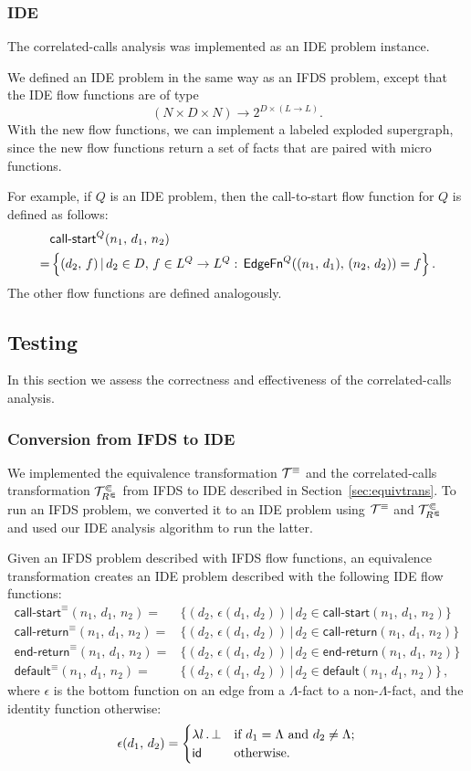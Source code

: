 \subsubsection{IDE}
The correlated-calls analysis was implemented as an IDE problem instance.

We defined an IDE problem in the same way as an IFDS problem, except that the IDE flow functions are of type
\[
  (N\times D\times N)\to2^{D\times (L\to L)}.
\]
With the new flow functions, we can implement a labeled exploded supergraph, since the new flow functions return a set of facts that are paired with micro functions.

For example, if $Q$ is an IDE problem, then the call-to-start flow function for $Q$ is defined as follows:
\begin{align*}
  &\textsf{call-start}^Q(n_1,\,d_1,\,n_2)\\
  =&\left\{(d_2,\,f)\,|\,d_2\in D,\,f\in L^Q\to L^Q:\,\textsf{EdgeFn}^Q((n_1,\,d_1),\,(n_2,\,d_2))=f\right\}.
\end{align*}
The other flow functions are defined analogously.

\subsection{Testing}
In this section we assess the correctness and effectiveness of the correlated-calls analysis.

\subsubsection{Conversion from IFDS to IDE}
We implemented the equivalence transformation $\mathcal T^\equiv$ and the correlated-calls transformation $\mathcal T^\Subset_{R^\Subset}$ from IFDS to IDE described in Section~\ref{sec:equivtrans}. To run an IFDS problem, we converted it to an IDE problem using $\mathcal T^\equiv$ and $\mathcal T^\Subset_{R^\Subset}$ and used our IDE analysis algorithm to run the latter.

Given an IFDS problem described with IFDS flow functions, an equivalence transformation creates an IDE problem described with the following IDE flow functions:
\begin{align*}
  \textsf{call-start}^\equiv(n_1,\,d_1,\,n_2)=&\{(d_2,\,\epsilon(d_1,\,d_2))\,|\,d_2\in\textsf{call-start}(n_1,\,d_1,\,n_2)\}\\
  \textsf{call-return}^\equiv(n_1,\,d_1,\,n_2)=&\{(d_2,\,\epsilon(d_1,\,d_2))\,|\,d_2\in\textsf{call-return}(n_1,\,d_1,\,n_2)\}\\
  \textsf{end-return}^\equiv(n_1,\,d_1,\,n_2)=&\{(d_2,\,\epsilon(d_1,\,d_2))\,|\,d_2\in\textsf{end-return}(n_1,\,d_1,\,n_2)\}\\
  \textsf{default}^\equiv(n_1,\,d_1,\,n_2)=&\{(d_2,\,\epsilon(d_1,\,d_2))\,|\,d_2\in\textsf{default}(n_1,\,d_1,\,n_2)\}\,,
\end{align*}
where $\epsilon$ is the bottom function on an edge from a $\Lambda$-fact to a non-$\Lambda$-fact, and the identity function otherwise:
\[
  \epsilon(d_1,\,d_2)=\begin{cases}
    \lambda l\,.\,\bot&\text{if $d_1=\Lambda$ and $d_2\ne\Lambda$;}\\
    \textsf{id}&\text{otherwise.}
  \end{cases}
\]

